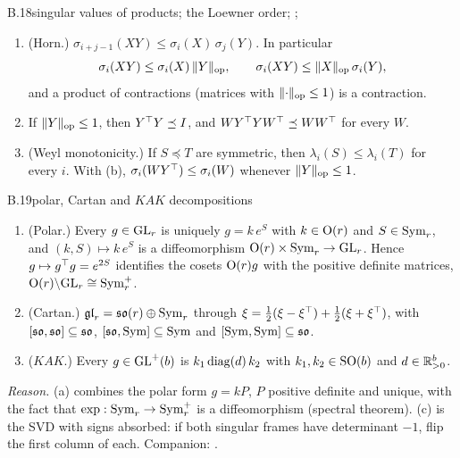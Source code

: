 \begin{auxresult}{B.18}{singular values of products; the Loewner order}{\citep[Ch.~3]{xhorn1991topics};
\citep[Ch.~III]{xbhatia1997matrix}; \citep[Ch.~7]{xhorn2013matrix}}
\begin{enumerate}[label=(\alph*)]
  \item (Horn.) $\sigma_{i+j-1}(XY)\le\sigma_i(X)\,\sigma_j(Y)$. In particular
    \begin{equation*}
      \sigma_i(XY)\le\sigma_i(X)\,\lVert Y\rVert_{\rm op},\qquad\sigma_i(XY)\le\lVert X\rVert_{\rm op}\,\sigma_i(Y),
    \end{equation*}
    and a product of contractions (matrices with $\lVert\cdot\rVert_{\rm op}\le1$) is a contraction.
  \item If $\lVert Y\rVert_{\rm op}\le1$, then $Y^{\top} Y\preceq I$, and $WY^{\top} YW^{\top}\preceq WW^{\top}$ for every $W$.
  \item (Weyl monotonicity.) If $S\preceq T$ are symmetric, then $\lambda_i(S)\le\lambda_i(T)$ for every $i$. With (b),
    $\sigma_i(WY^{\top})\le\sigma_i(W)$ whenever $\lVert Y\rVert_{\rm op}\le1$.
\end{enumerate}
\end{auxresult}

\begin{auxresult}{B.19}{polar, Cartan and $KAK$ decompositions}{\citep[Ch.~2 and 7]{xhorn2013matrix}}
\begin{enumerate}[label=(\alph*)]
  \item (Polar.) Every $g\in\mathrm{GL}_r$ is uniquely $g=k\,e^S$ with $k\in\mathrm{O}(r)$ and $S\in\mathrm{Sym}_r$, and
    $(k,S)\mapsto k\,e^S$ is a diffeomorphism $\mathrm{O}(r)\times\mathrm{Sym}_r\to\mathrm{GL}_r$. Hence $g\mapsto g^{\top} g=e^{2S}$ identifies the
    cosets $\mathrm{O}(r)g$ with the positive definite matrices, $\mathrm{O}(r)\backslash\mathrm{GL}_r\cong\mathrm{Sym}^+_r$.
  \item (Cartan.) $\mathfrak{gl}_r=\mathfrak{so}(r)\oplus\mathrm{Sym}_r$ through $\xi=\tfrac12(\xi-\xi^{\top})+\tfrac12(\xi+\xi^{\top})$, with
    $[\mathfrak{so},\mathfrak{so}]\subseteq\mathfrak{so}$, $[\mathfrak{so},\mathrm{Sym}]\subseteq\mathrm{Sym}$ and $[\mathrm{Sym},\mathrm{Sym}]\subseteq\mathfrak{so}$.
  \item ($KAK$.) Every $g\in\mathrm{GL}^+(b)$ is $k_1\operatorname{diag}(d)\,k_2$ with $k_1,k_2\in\mathrm{SO}(b)$ and $d\in\mathbb{R}^b_{>0}$.
\end{enumerate}
\end{auxresult}
\noindent\emph{Reason.} (a) combines the polar form $g=kP$, $P$ positive definite and unique, with the fact that
$\exp:\mathrm{Sym}_r\to\mathrm{Sym}_r^+$ is a diffeomorphism (spectral theorem). (c) is the SVD with signs absorbed: if both singular
frames have determinant $-1$, flip the first column of each. Companion: .

